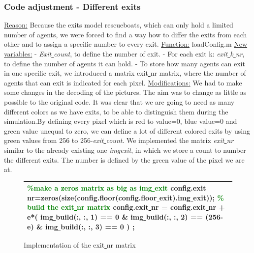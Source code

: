 \documentclass[11pt]{article}
\begin{document}
\subsubsection{Code adjustment - Different exits}
\underline{Reason:}
\newline
Because the exits model rescueboats, which can only hold a limited number of agents, we were forced to find a way how to differ the exits from each other and to assign a specific number to every exit.
\newline
\underline{Function:}
\newline
loadConfig.m
\newline
\underline{New variables:}
\newline
- \textit{Exit\underline{ }count}, to define the number of exit.\newline
- For each exit k: \textit{exit\underline{ }k\underline{ }nr}, to define the number of agents it can hold.\newline
- To store how many agents can exit in one specific exit, we introduced a matrix exit\underline{ }nr matrix, where the number of agents that can exit is indicated for each pixel.
\underline{Modifications:}
\newline 
We had to make some changes in the decoding of the pictures. The aim was to change as little as possible to the original code. It was clear that we are going to need as many different colors as we have exits, to be able to distinguish them during the simulation.By defining every pixel which is red to value=0, blue value=0 and green value unequal to zero, we can define a lot of different colored exits by using green values from 256 to 256-\textit{exit\underline{ }count}.
\newline
We implemented the matrix \textit{exit\underline{ }nr} similar to the already existing one \textit{img\underline{}exit}, in which we store a count to number the different exits. The number is defined by the green value of  the pixel we are at.

\begin{figure}[h]
\centering
\begin{tabular}
{|>{\large}m{\textwidth}|} \hline
\bigskip
\textcolor{green}{\%make a zeros matrix as big as img\underline{ }exit}
\newline
config.exit\underline{ }nr=zeros(size(config.floor(config.floor\underline{ }exit).img\underline{ }exit));
\newline
\textcolor{green}{\% build the exit\underline{ }nr matrix}
\newline
config.exit\underline{ }nr = config.exit\underline{ }nr + e*( img\underline{ }build(:, :, 1) == 0 \& img\underline{ }build(:, :, 2) == (256-e) \& img\underline{ }build(:, :, 3) == 0 ) ;
\bigskip
\\ \hline
\end{tabular}
\caption{Implementation of the exit\underline{ }nr matrix}
\end{figure}
\end{document}
